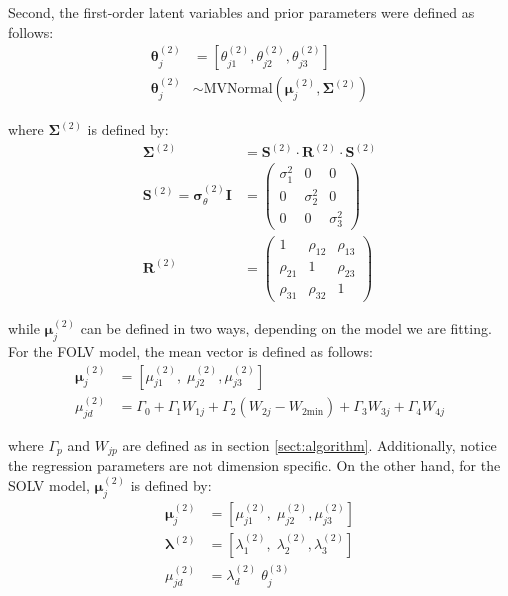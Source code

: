Second, the first-order latent variables and prior parameters were defined as follows:
%
\begin{align}
	\boldsymbol{\theta}^{(2)}_{j} &= \left[ \theta_{j1}^{(2)}, \theta_{j2}^{(2)}, \theta_{j3}^{(2)} \right] \\
	\boldsymbol{\theta}^{(2)}_{j} &\sim \text{MVNormal} \left( \boldsymbol{\mu}^{(2)}_{j}, \boldsymbol{\Sigma}^{(2)} \right)
\end{align}

where $\boldsymbol{\Sigma}^{(2)}$ is defined by:
%
\begin{align}
	\boldsymbol{\Sigma}^{(2)} &= \boldsymbol{S}^{(2)} \cdot \boldsymbol{R}^{(2)} \cdot \boldsymbol{S}^{(2)} \\
	\boldsymbol{S}^{(2)} = \pmb{\sigma}^{(2)}_{\theta} \mathbf{I} &= 
	\begin{pmatrix}
		\sigma^{2}_{1}	& 0 			 	& 0 				\\
		0 				& \sigma^{2}_{2} 	& 0 				\\
		0 				& 0					& \sigma^{2}_{3} 
	\end{pmatrix} \\
	\boldsymbol{R}^{(2)} &= 
	\begin{pmatrix}
		1			& \rho_{12} & \rho_{13} 	\\
		\rho_{21} 	& 1 		& \rho_{23} 	\\
		\rho_{31} 	& \rho_{32}	& 1	
	\end{pmatrix} 
\end{align}

while $\boldsymbol{\mu}^{(2)}_{j}$ can be defined in two ways, depending on the model we are fitting. For the FOLV model, the mean vector is defined as follows:
%
\begin{align}
	\boldsymbol{\mu}^{(2)}_{j} &= \left[ \mu^{(2)}_{j1}, \; \mu^{(2)}_{j2}, \mu^{(2)}_{j3} \right] \\
	\mu^{(2)}_{jd} &= \Gamma_{0} + \Gamma_{1} W_{1j} + \Gamma_{2} (W_{2j} - W_{2\text{min}}) + \Gamma_{3} W_{3j} + \Gamma_{4} W_{4j}
\end{align}

where $\Gamma_{p}$ and $W_{jp}$ are defined as in section \ref{sect:algorithm}. Additionally, notice the regression parameters are not dimension specific. On the other hand, for the SOLV model, $\boldsymbol{\mu}^{(2)}_{j}$ is defined by:
%
\begin{align}
	\boldsymbol{\mu}^{(2)}_{j} &= \left[ \mu^{(2)}_{j1}, \; \mu^{(2)}_{j2}, \mu^{(2)}_{j3} \right] \\
	\pmb{\lambda}^{(2)} &= \left[ \lambda^{(2)}_{1}, \; \lambda^{(2)}_{2}, \lambda^{(2)}_{3} \right] \\
	\mu^{(2)}_{jd} &= \lambda^{(2)}_{d} \; \theta^{(3)}_{j} 
\end{align}


